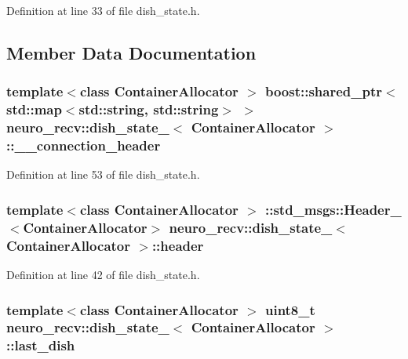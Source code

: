 \-Definition at line 33 of file dish\-\_\-state.\-h.



\subsection{\-Member \-Data \-Documentation}
\subsubsection[{\-\_\-\-\_\-connection\-\_\-header}]{\setlength{\rightskip}{0pt plus 5cm}template$<$class Container\-Allocator $>$ boost\-::shared\-\_\-ptr$<$std\-::map$<$std\-::string, std\-::string$>$ $>$ {\bf neuro\-\_\-recv\-::dish\-\_\-state\-\_\-}$<$ \-Container\-Allocator $>$\-::{\bf \-\_\-\-\_\-connection\-\_\-header}}\label{structneuro__recv_1_1dish__state___aa58b6bfcfc13fcca8547ac5cc5327979}


\-Definition at line 53 of file dish\-\_\-state.\-h.

\subsubsection[{header}]{\setlength{\rightskip}{0pt plus 5cm}template$<$class Container\-Allocator $>$ \-::std\-\_\-msgs\-::\-Header\-\_\-$<$\-Container\-Allocator$>$ {\bf neuro\-\_\-recv\-::dish\-\_\-state\-\_\-}$<$ \-Container\-Allocator $>$\-::{\bf header}}\label{structneuro__recv_1_1dish__state___a9e7e74618588be94ff27db06983c1be3}


\-Definition at line 42 of file dish\-\_\-state.\-h.

\subsubsection[{last\-\_\-dish}]{\setlength{\rightskip}{0pt plus 5cm}template$<$class Container\-Allocator $>$ uint8\-\_\-t {\bf neuro\-\_\-recv\-::dish\-\_\-state\-\_\-}$<$ \-Container\-Allocator $>$\-::{\bf last\-\_\-dish}}\label{structneuro__recv_1_1dish__state___a53be60cb1bc2667646c026f1a433bfb6}


